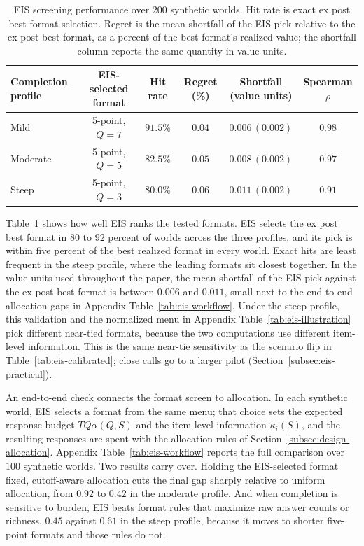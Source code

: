\documentclass[11pt]{article}
\theoremstyle{definition}
\theoremstyle{remark}
\newcommand{\1}{\mathbf{1}}
\begin{document}
\FloatBarrier
\begin{table}[H]
\centering
\scriptsize
\setlength{\tabcolsep}{4pt}
\begin{tabular}{lccccc}
\toprule
Completion profile & EIS-selected format & Hit rate & Regret (\%) & \shortstack{Shortfall\\(value units)} & Spearman $\rho$ \\
\midrule
Mild     & 5-point, $Q=7$ & $91.5\%$ & $0.04$ & $0.006\,(0.002)$ & $0.98$ \\
Moderate & 5-point, $Q=5$ & $82.5\%$ & $0.05$ & $0.008\,(0.002)$ & $0.97$ \\
Steep    & 5-point, $Q=3$ & $80.0\%$ & $0.06$ & $0.011\,(0.002)$ & $0.91$ \\
\bottomrule
\end{tabular}
\caption{EIS screening performance over \(200\) synthetic worlds. Hit rate is exact ex post best-format selection. Regret is the mean shortfall of the EIS pick relative to the ex post best format, as a percent of the best format's realized value; the shortfall column reports the same quantity in value units.}
\label{tab:eis-validation}
\end{table}

Table~\ref{tab:eis-validation} shows how well EIS ranks the tested
formats. EIS selects the ex post best format in \(80\) to \(92\)
percent of worlds across the three profiles, and its pick is within
five percent of the best realized format in every world. Exact hits are
least frequent in the steep profile, where the leading formats sit
closest together. In the value units used throughout the paper, the
mean shortfall of the EIS pick against the ex post best format is
between \(0.006\) and \(0.011\), small next to the end-to-end
allocation gaps in Appendix Table~\ref{tab:eis-workflow}. Under the
steep profile, this validation and the normalized menu in Appendix
Table~\ref{tab:eis-illustration} pick different near-tied formats,
because the two computations use different item-level information. This
is the same near-tie sensitivity as the scenario flip in
Table~\ref{tab:eis-calibrated}; close calls go to a larger pilot
(Section~\ref{subsec:eis-practical}).

An end-to-end check connects the format screen to allocation. In each
synthetic world, EIS selects a format from the same menu; that choice
sets the expected response budget \(TQ\alpha(Q,S)\) and the item-level
information \(\kappa_i(S)\), and the resulting responses are spent
with the allocation rules of Section~\ref{subsec:design-allocation}.
Appendix Table~\ref{tab:eis-workflow} reports the full comparison over
\(100\) synthetic worlds. Two results carry over. Holding the
EIS-selected format fixed, cutoff-aware allocation cuts the final gap
sharply relative to uniform allocation, from \(0.92\) to \(0.42\) in
the moderate profile. And when completion is sensitive to burden, EIS
beats format rules that maximize raw answer counts or richness,
\(0.45\) against \(0.61\) in the steep profile, because it moves to
shorter five-point formats and those rules do not.
\end{document}
